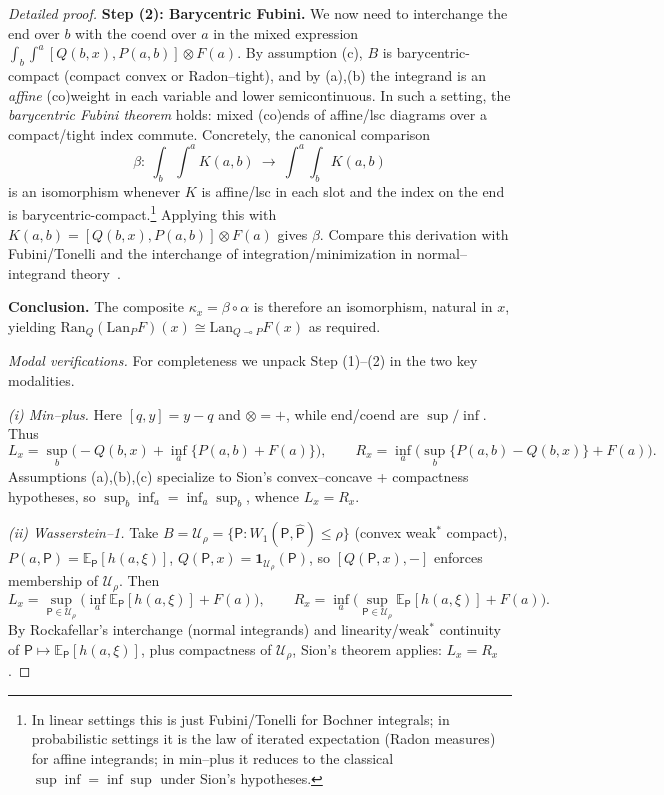 \documentclass[11pt]{article}
\numberwithin{equation}{section}
\theoremstyle{upright}
\newcommand{\Lan}{\mathrm{Lan}}
\newcommand{\Ran}{\mathrm{Ran}}
\newcommand{\resid}{\multimap}
\begin{document}
\begin{proof}[Detailed proof]
\smallskip
\noindent\textbf{Step (2): Barycentric Fubini.}
We now need to interchange the end over $b$ with the coend over $a$ in the mixed expression
\(
\int_{b}\int^{a}[Q(b,x),P(a,b)]\otimes F(a).
\)
By assumption (c), $B$ is barycentric-compact (compact convex or Radon–tight), and by (a),(b) the integrand is an \emph{affine} (co)weight in each variable and lower semicontinuous. In such a setting, the \emph{barycentric Fubini theorem} holds: mixed (co)ends of affine/lsc diagrams over a compact/tight index commute. Concretely, the canonical comparison
\[
\beta:\ \int_{b}\int^{a}K(a,b)\ \longrightarrow\ \int^{a}\int_{b}K(a,b)
\]
is an isomorphism whenever $K$ is affine/lsc in each slot and the index on the end is barycentric-compact.\footnote{In linear settings this is just Fubini/Tonelli for Bochner integrals; in probabilistic settings it is the law of iterated expectation (Radon measures) for affine integrands; in min--plus it reduces to the classical $\sup\inf=\inf\sup$ under Sion’s hypotheses.} Applying this with $K(a,b)=[Q(b,x),P(a,b)]\otimes F(a)$ gives $\beta$. Compare this derivation with Fubini/Tonelli and the interchange of integration/minimization in
normal–integrand theory~\citep[§14E]{RockafellarWets1998}.

\smallskip
\noindent\textbf{Conclusion.}
The composite $\kappa_x=\beta\circ\alpha$ is therefore an isomorphism, natural in $x$, yielding
\(
\Ran_Q(\Lan_PF)(x)\cong \Lan_{Q\resid P}F(x)
\)
as required.
\medskip

\noindent\emph{Modal verifications.} For completeness we unpack Step (1)–(2) in the two key modalities.

\smallskip
\emph{(i) Min--plus.} Here $[q,y]=y-q$ and $\otimes=+$, while end/coend are $\sup/\inf$. Thus
\[
L_x=\sup_{b}\Big(-Q(b,x)+\inf_{a}\{P(a,b)+F(a)\}\Big),
\qquad
R_x=\inf_{a}\Big(\sup_{b}\{P(a,b)-Q(b,x)\}+F(a)\Big).
\]
Assumptions (a),(b),(c) specialize to Sion’s convex–concave + compactness hypotheses, so $\sup_b\inf_a=\inf_a\sup_b$, whence $L_x=R_x$.

\smallskip
\emph{(ii) Wasserstein--1.} Take $B=\mathcal U_\rho=\{\mathsf P:W_1(\mathsf P,\widehat{\mathsf P})\le\rho\}$ (convex weak$^\ast$ compact), $P(a,\mathsf P)=\mathbb E_{\mathsf P}[h(a,\xi)]$, $Q(\mathsf P,x)=\mathbf 1_{\mathcal U_\rho}(\mathsf P)$, so $[Q(\mathsf P,x),-]$ enforces membership of $\mathcal U_\rho$. Then
\[
L_x=\sup_{\mathsf P\in\mathcal U_\rho}\Big(\inf_{a}\mathbb E_{\mathsf P}[h(a,\xi)]+F(a)\Big),
\qquad
R_x=\inf_{a}\Big(\sup_{\mathsf P\in\mathcal U_\rho}\mathbb E_{\mathsf P}[h(a,\xi)]+F(a)\Big).
\]
By Rockafellar’s interchange (normal integrands) and linearity/weak$^\ast$ continuity of $\mathsf P\mapsto \mathbb E_{\mathsf P}[h(a,\xi)]$, plus compactness of $\mathcal U_\rho$, Sion’s theorem applies: $L_x=R_x$.
\end{proof}
\end{document}
